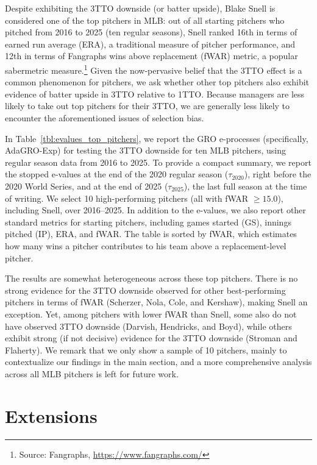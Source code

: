 \documentclass[12pt,twoside]{article}
\theoremstyle{plain}
\theoremstyle{definition}
\theoremstyle{remark}
\begin{document}
Despite exhibiting the 3TTO downside (or batter upside), Blake Snell is considered one of the top pitchers in MLB: out of all starting pitchers who pitched from 2016 to 2025 (ten regular seasons), Snell ranked 16th in terms of earned run average (ERA), a traditional measure of pitcher performance, and 12th in terms of Fangraphs wins above replacement (fWAR) metric, a popular sabermetric measure.\footnote{Source: Fangraphs, \url{https://www.fangraphs.com/}}
Given the now-pervasive belief that the 3TTO effect is a common phenomenon for pitchers, we ask whether other top pitchers also exhibit evidence of batter upside in 3TTO relative to 1TTO.
Because managers are less likely to take out top pitchers for their 3TTO, we are generally less likely to encounter the aforementioned issues of selection bias. 

In Table~\ref{tbl:evalues_top_pitchers}, we report the GRO e-processes (specifically, AdaGRO-Exp) for testing the 3TTO downside for ten MLB pitchers, using regular season data from 2016 to 2025. 
To provide a compact summary, we report the stopped e-values at the end of the 2020 regular season ($\tau_{2020}$), right before the 2020 World Series, and at the end of 2025 ($\tau_{2025}$), the last full season at the time of writing. 
We select 10 high-performing pitchers (all with fWAR $\geq 15.0$), including Snell, over 2016--2025. 
In addition to the e-values, we also report other standard metrics for starting pitchers, including games started (GS), innings pitched (IP), ERA, and fWAR. 
The table is sorted by fWAR, which estimates how many wins a pitcher contributes to his team above a replacement-level pitcher.

The results are somewhat heterogeneous across these top pitchers. 
There is no strong evidence for the 3TTO downside observed for other best-performing pitchers in terms of fWAR (Scherzer, Nola, Cole, and Kershaw), making Snell an exception. 
Yet, among pitchers with lower fWAR than Snell, some also do not have observed 3TTO downside (Darvish, Hendricks, and Boyd), while others exhibit strong (if not decisive) evidence for the 3TTO downside (Stroman and Flaherty). 
We remark that we only show a sample of 10 pitchers, mainly to contextualize our findings in the main section, and a more comprehensive analysis across all MLB pitchers is left for future work. 



\section{Extensions}\label{sec:extensions}
\end{document}
